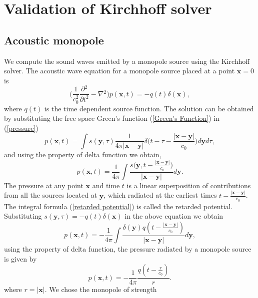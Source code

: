 \documentclass[a4paper]{article}
\begin{document}
\section{Validation of Kirchhoff solver}
\subsection{Acoustic monopole}
We compute the sound waves emitted by a monopole source using the Kirchhoff solver. The acoustic wave equation for a monopole source placed at a point $\mathbf{x} = 0$ is
\begin{equation}
	\Bigg( \frac{1}{c_{0}^2}\frac{\partial{}^{2}}{\partial{t}^{2}}- \nabla{}^{2} \Bigg) p(\mathbf{x}, t)  = -q(t)\delta(\mathbf{x}),
\end{equation}
where $q(t)$ is the time dependent source function. The solution can be obtained by substituting the free space Green's function (\ref{Green's Function}) in (\ref{pressure})
\begin{equation}
	p(\mathbf{x}, t) = \int s(\mathbf{y}, \tau) \frac{1}{4\pi|\mathbf{x} - \mathbf{y}|}\delta \Bigg(t - \tau - \frac{|\mathbf{x} - \mathbf{y}|}{c_{0}}\Bigg)d\mathbf{y}d\tau,
\end{equation}
and using the property of delta function we obtain,
\begin{equation}\label{retarded potential}
	p(\mathbf{x}, t) = \frac{1}{4\pi}\int \frac{s\Big(\mathbf{y}, t - \frac{|\mathbf{x} - \mathbf{y}|}{c_{0}}\Big)}{|\mathbf{x} - \mathbf{y}|}d\mathbf{y}.
\end{equation}
The pressure at any point $\mathbf{x}$ and time $t$ is a linear superposition of contributions from all the sources located at $\mathbf{y}$, which radiated at the earliest times $t - \frac{|\mathbf{x} - \mathbf{y}|}{c_{0}}$. The integral formula (\ref{retarded potential}) is called the retarded potential. Substituting $s(\mathbf{y}, \tau) = -q(t)\delta(\mathbf{x})$ in the above equation we obtain
\begin{equation}
	p(\mathbf{x}, t) = -\frac{1}{4\pi}\int \frac{ \delta (\mathbf{y}) q(t - \frac{|\mathbf{x} - \mathbf{y}|}{c_{0}}) }{{|\mathbf{x} - \mathbf{y}|}}d\mathbf{y},
\end{equation}
using the property of delta function, the pressure radiated by a monopole source is given by
\begin{equation}
	p(\mathbf{x}, t) = -\frac{1}{4\pi} \frac{  q(t - \frac{r}{c_{0}}) }{r}.
\end{equation}
where $r = {|\mathbf{x}|}$.
We chose the monopole of strength
\end{document}
